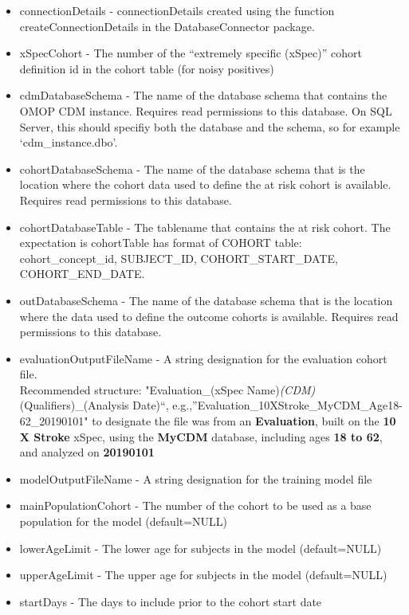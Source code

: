 \documentclass[]{article}
\providecommand{\tightlist}{%
  \setlength{\itemsep}{0pt}\setlength{\parskip}{0pt}}
\begin{document}
\begin{itemize}
\tightlist
\item
  connectionDetails - connectionDetails created using the function
  createConnectionDetails in the DatabaseConnector package.
\item
  xSpecCohort - The number of the ``extremely specific (xSpec)'' cohort
  definition id in the cohort table (for noisy positives)
\item
  cdmDatabaseSchema - The name of the database schema that contains the
  OMOP CDM instance. Requires read permissions to this database. On SQL
  Server, this should specifiy both the database and the schema, so for
  example `cdm\_instance.dbo'.
\item
  cohortDatabaseSchema - The name of the database schema that is the
  location where the cohort data used to define the at risk cohort is
  available. Requires read permissions to this database.
\item
  cohortDatabaseTable - The tablename that contains the at risk cohort.
  The expectation is cohortTable has format of COHORT table:
  cohort\_concept\_id, SUBJECT\_ID, COHORT\_START\_DATE,
  COHORT\_END\_DATE.
\item
  outDatabaseSchema - The name of the database schema that is the
  location where the data used to define the outcome cohorts is
  available. Requires read permissions to this database.
\item
  evaluationOutputFileName - A string designation for the evaluation
  cohort file.\\
  Recommended structure: "Evaluation\_(xSpec
  Name)\emph{(CDM)}(Qualifiers)\_(Analysis Date)``,
  e.g.,''Evaluation\_10XStroke\_MyCDM\_Age18-62\_20190101" to designate
  the file was from an \textbf{Evaluation}, built on the \textbf{10 X
  Stroke} xSpec, using the \textbf{MyCDM} database, including ages
  \textbf{18 to 62}, and analyzed on \textbf{20190101}
\item
  modelOutputFileName - A string designation for the training model file
\item
  mainPopulationCohort - The number of the cohort to be used as a base
  population for the model (default=NULL)
\item
  lowerAgeLimit - The lower age for subjects in the model (default=NULL)
\item
  upperAgeLimit - The upper age for subjects in the model (default=NULL)
\item
  startDays - The days to include prior to the cohort start date

\end{itemize}
\end{document}

